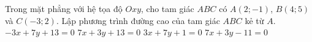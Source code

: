 \begin{ex}%
	Trong mặt phẳng với hệ tọa độ $Oxy$, cho tam giác $ABC$ có
	$A(2;-1)$, $B(4;5)$ và $C(-3;2)$. Lập phương trình đường cao của tam giác $ABC$ kẻ từ $A$.
	\choice
	{$-3x +7y +13 =0$}
	{$7x +3y +13=0$}
	{$3x +7y+1 =0$}
	{\True $7x +3y -11 =0$}
\end{ex}



